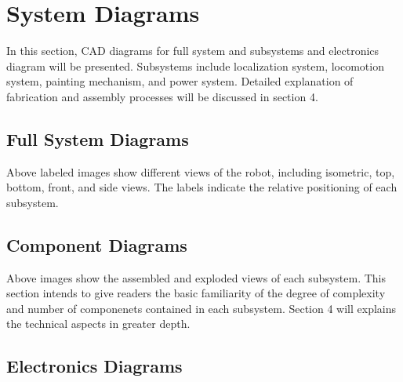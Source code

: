 
\section{System Diagrams}
\label{sec:system_diagrams}

In this section, CAD diagrams for full system and subsystems and electronics diagram will be presented. Subsystems include localization system, locomotion system, painting mechanism, and power system. Detailed explanation of fabrication and assembly processes will be discussed in section 4. 

\subsection{Full System Diagrams}
\label{sec:full_sys_diagrams}

Above labeled images show different views of the robot, including isometric, top, bottom, front, and side views. The labels indicate the relative positioning of each subsystem. 

\subsection{Component Diagrams}
\label{sec:component_diagrams}

Above images show the assembled and exploded views of each subsystem. This section intends to give readers the basic familiarity of the degree of complexity and number of componenets contained in each subsystem. Section 4 will explains the technical aspects in greater depth. 

\subsection{Electronics Diagrams}
\label{sec:electronics_diagrams}